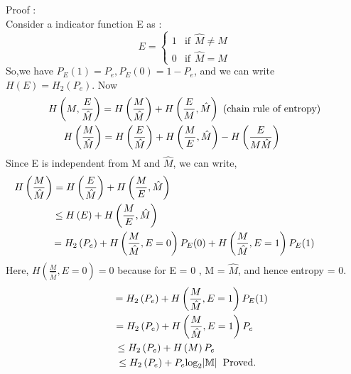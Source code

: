 \documentclass{article}
\begin{document}
 Proof : \\
 Consider a indicator function  E as :
 \begin{equation}
 	E = \left\{\begin{matrix}
 	1 	& \text{if}  \hspace{5pt}\hat{M} \neq  M \\ 
 	0	&  \text{if} \hspace{5pt} \hat{M} = M
 	\end{matrix}\right.
 \end{equation}
 So,we have $P_E(1)= P_e , P_E(0) = 1 -P_e$, and we can write $H(E) = H_{2}(P_e)$. Now
\begin{gather}
H \left (M,\frac{E}{\hat{M}} \right) = H \left (\frac{M}{\hat{M}} \right ) + H \left(\frac{E}{M}, \hat{M} \right) \text{ (chain rule of entropy)}\\
\hspace*{-9mm}H \left(\frac{M}{\hat{M}}\right)  = H \left( \frac{E}{\hat{M}}\right) +  H \left( \frac{M}{E}, \hat{M} \right) - H\left(   \frac{E}{M\hat{M}} \right)
\end{gather} 
Since E is independent from M and $\hat{M}$, we can write, 
\begin{gather}
\hspace*{-6.5cm} H \left(\frac{M}{\hat{M}}\right)  = H \left( \frac{E}{\hat{M}}\right) +  H \left( \frac{M}{E}, \hat{M} \right)\\
\hspace*{-5.5cm} \leq  H\left( E\right) +   H \left( \frac{M}{E}, \hat{M} \right) \\
 = H_{2}\left( P_e\right) +   H \left( \frac{M}{\hat{M}}, E=0 \right) P_E(0) +  H \left( \frac{M}{\hat{M}}, E=1 \right) P_E(1)
\end{gather}
Here,  $ H \left( \frac{M}{\hat{M}}, E=0 \right) = 0$ because for E = 0 , M = $\hat{M}$, and hence entropy = 0.
 \begin{gather}
\hspace*{.5cm} = H_{2}\left( P_e\right) +  H \left( \frac{M}{\hat{M}}, E=1 \right) P_E(1)\\
 = H_{2}\left( P_e\right) +  H \left( \frac{M}{\hat{M}}, E=1 \right) P_e\\
\hspace*{-1.3cm} \leq  H_{2}\left( P_e\right) +  H \left(M\right) P_e\\
\hspace*{.2cm} \leq  H_{2}\left( P_e\right) +  P_e \text{log}_{2}|\mathbb{M}|\hspace*{2mm} \text{Proved.}
 \end{gather}
\end{document}
